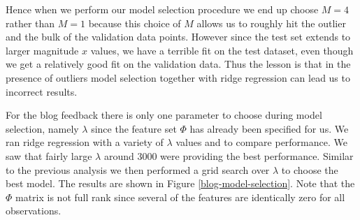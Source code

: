 \documentclass{article}
\begin{document}
%
%
%
Hence when we perform our model selection procedure we end up choose $M = 4$ rather than $M = 1$ because this choice of $M$ allows us to roughly hit the outlier and the bulk of the validation data points. However since the test set extends to larger magnitude $x$ values, we have a terrible fit on the test dataset, even though we get a relatively good fit on the validation data. Thus the lesson is that in the presence of outliers model selection together with ridge regression can lead us to incorrect results.
%
%

For the blog feedback there is only one parameter to choose during model selection, namely $\lambda$ since the feature set $\Phi$ has already been specified for us. We ran ridge regression with a variety of $\lambda$ values and to compare performance. We saw that fairly large $\lambda$ around $3000$ were providing the best performance. Similar to the previous analysis we then performed a grid search over $\lambda$ to choose the best model. The results are shown in Figure \ref{blog-model-selection}. Note that the $\Phi$ matrix is not full rank since several of the features are identically zero for all observations.
%
\end{document}

